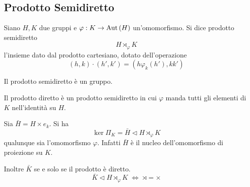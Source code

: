 \subsection{Prodotto Semidiretto}
\begin{multicols}{2}
	\begin{definition}
		Siano $ H, K $ due gruppi e $ \varphi: K \rightarrow \mathrm{Aut}\left( H \right) $ un'omomorfismo. Si dice prodotto semidiretto
		\[ H \rtimes_\varphi K \]
		l'insieme dato dal prodotto cartesiano, dotato dell'operazione
		\[ (h, k) \cdot (h', k') = (h \varphi_k(h'), kk') \]
	\end{definition}

\begin{remark}
	Il prodotto semidiretto è un gruppo.
\end{remark}
\begin{remark}
	Il prodotto diretto è un prodotto semidiretto in cui $ \varphi $ manda tutti gli elementi di $ K $ nell'identità su $ H $.
\end{remark}
\begin{remark}
	Sia $ \bar{H} = H \times {e_k} $. Si ha $$  \ker\Pi_K =  \bar{H} \lhd H \rtimes_\varphi K  $$ qualunque sia l'omomorfismo $ \varphi$. Infatti $ \bar{H} $ è il nucleo dell'omomorfismo di proiezione su $ K $.
\end{remark}
\begin{remark}
	Inoltre $ \bar{K}$ se e solo se il prodotto è diretto. $$  \bar{K} \lhd H \rtimes_\varphi K  \;\Leftrightarrow\; \rtimes = \times $$
\end{remark}


\end{multicols}
